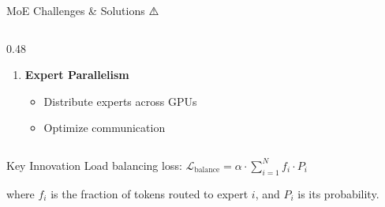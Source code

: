 \documentclass[aspectratio=169]{beamer}
\begin{document}
\begin{frame}[shrink=10]{MoE Challenges \& Solutions ⚠️}
\begin{columns}[T]
\begin{column}{0.48\textwidth}
\begin{enumerate}
    \vspace{0.3em}

    \item \textbf{Expert Parallelism}
    \begin{itemize}\setlength{\itemsep}{0pt}
        \item Distribute experts across GPUs
        \item Optimize communication
    \end{itemize}
\end{enumerate}
\end{column}
\end{columns}

\vspace{1em}

\begin{alertblock}{Key Innovation}
Load balancing loss: $\mathcal{L}_{\text{balance}} = \alpha \cdot \sum_{i=1}^{N} f_i \cdot P_i$

where $f_i$ is the fraction of tokens routed to expert $i$, and $P_i$ is its probability.
\end{alertblock}
\end{frame}
\end{document}
